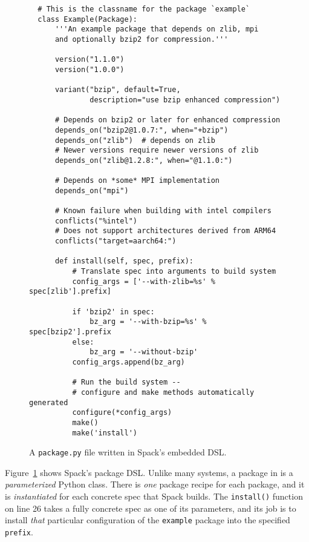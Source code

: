 \begin{figure}
\begin{verbatim}
  # This is the classname for the package `example`
  class Example(Package):
      '''An example package that depends on zlib, mpi
      and optionally bzip2 for compression.'''

      version("1.1.0")
      version("1.0.0")

      variant("bzip", default=True,
              description="use bzip enhanced compression")

      # Depends on bzip2 or later for enhanced compression
      depends_on("bzip2@1.0.7:", when="+bzip")
      depends_on("zlib")  # depends on zlib
      # Newer versions require newer versions of zlib
      depends_on("zlib@1.2.8:", when="@1.1.0:")

      # Depends on *some* MPI implementation
      depends_on("mpi")

      # Known failure when building with intel compilers
      conflicts("%intel")
      # Does not support architectures derived from ARM64
      conflicts("target=aarch64:")

      def install(self, spec, prefix):
          # Translate spec into arguments to build system
          config_args = ['--with-zlib=%s' % spec[zlib'].prefix]

          if 'bzip2' in spec:
              bz_arg = '--with-bzip=%s' % spec[bzip2'].prefix
          else:
              bz_arg = '--without-bzip'
          config_args.append(bz_arg)

          # Run the build system --
          # configure and make methods automatically generated
          configure(*config_args)
          make()
          make('install')
\end{verbatim}
\caption{
  A {\tt package.py} file written in Spack's embedded DSL.
  \label{fig:example-spack-package}
}
\end{figure}

Figure~\ref{fig:example-spack-package} shows Spack's package DSL. Unlike many systems, a
package in \spack is a {\it parameterized} Python class. There is {\it one} package
recipe for each package, and it is {\it instantiated} for each concrete spec that Spack
builds. The {\tt install()} function on line 26 takes a fully concrete spec as one of
its parameters, and its job is to install {\it that} particular configuration of the
{\tt example} package into the specified {\tt prefix}.

